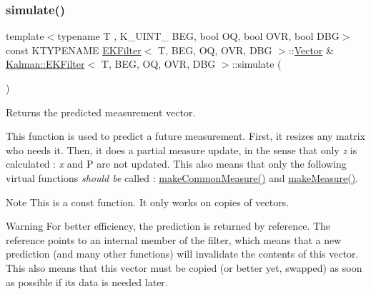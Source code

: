 \subsubsection{\texorpdfstring{simulate()}{simulate()}}
{\footnotesize\ttfamily template$<$typename T , K\+\_\+\+U\+I\+N\+T\+\_ B\+EG, bool OQ, bool O\+VR, bool D\+BG$>$ \\
const K\+T\+Y\+P\+E\+N\+A\+ME \mbox{\hyperlink{classKalman_1_1EKFilter}{E\+K\+Filter}}$<$ T, B\+EG, OQ, O\+VR, D\+BG $>$\+::\mbox{\hyperlink{classKalman_1_1EKFilter_af773d1217ecb01925b857d49b32bc636}{Vector}} \& \mbox{\hyperlink{classKalman_1_1EKFilter}{Kalman\+::\+E\+K\+Filter}}$<$ T, B\+EG, OQ, O\+VR, D\+BG $>$\+::simulate (\begin{DoxyParamCaption}{ }\end{DoxyParamCaption})}



Returns the predicted measurement vector. 

This function is used to predict a future measurement. First, it resizes any matrix who needs it. Then, it does a partial measure update, in the sense that only {\itshape z} is calculated \+: {\itshape x} and P are not updated. This also means that only the following virtual functions {\itshape should be} called \+: {\ttfamily \mbox{\hyperlink{classKalman_1_1EKFilter_a89337cacd8115338ffd34637f0ecbd92}{make\+Common\+Measure()}}} and {\ttfamily \mbox{\hyperlink{classKalman_1_1EKFilter_aac9f6d80e5ec9e6ea2ccf045cb682df8}{make\+Measure()}}}. \begin{DoxyNote}{Note}
This is a {\ttfamily const} function. It only works on copies of vectors. 
\end{DoxyNote}
\begin{DoxyWarning}{Warning}
For better efficiency, the prediction is returned by reference. The reference points to an internal member of the filter, which means that a new prediction (and many other functions) will invalidate the contents of this vector. This also means that this vector must be copied (or better yet, swapped) as soon as possible if its data is needed later. 
\end{DoxyWarning}
\mbox{\label{classKalman_1_1EKFilter_ac481300c7de95accb6d3705ee93cb35f}} 
